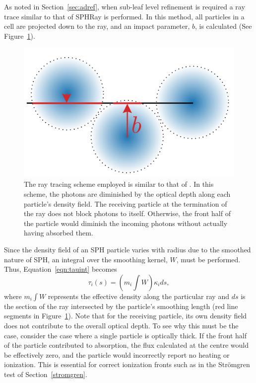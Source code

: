 \documentclass[fleq,usenatbib]{mnras}
\newcommand{\strom}{Str\"omgren}
\begin{document}
{As noted in Section~\ref{sec:adref}, when sub-leaf level 
refinement is required a ray trace similar to that of 
SPHRay is performed. In this method, all particles in a cell are projected 
down to the ray, and an impact parameter, $b$, is calculated (See 
Figure~\ref{fig:raytrace}).
\begin{figure}
\includegraphics[width=1\linewidth]{Figures/raytrace.pdf}
\caption{The ray tracing scheme employed is similar to that of 
\protect\cite{altayEt08}. In this scheme, the photons are diminished by the 
optical depth along each particle's density field. The receiving particle at 
the termination of the ray does not block photons to itself. Otherwise, the 
front half of the particle would diminish the incoming photons without 
actually having absorbed them.} 
\label{fig:raytrace}
\end{figure}
Since the density field of an SPH particle varies with radius due to the 
smoothed nature of SPH, an integral over the smoothing kernel, $W$, must be 
performed. Thus, Equation~\ref{eqn:tauint} becomes 
\begin{equation}
\tau_i(s) = \left(m_i\int W\right) \kappa_i ds,
\end{equation}
where $m_i \int W$ represents the effective density along the particular ray 
and $ds$ is the section of the ray intersected by the particle's smoothing 
length (red line segments in Figure~\ref{fig:raytrace}). Note that for the 
receiving particle, its own density field does not contribute to the overall 
optical depth. To see why this must be the case, consider the case where a 
single particle is optically thick. If the front half of the particle 
contributed to absorption, the flux calculated at the centre would be 
effectively zero, and the particle would incorrectly report no heating or 
ionization.  This is essential for correct ionization fronts such as in the 
\strom{} test of Section~\ref{stromgren}.

}
\end{document}
